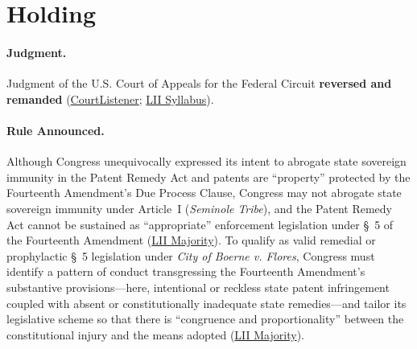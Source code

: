 \documentclass[12pt]{article}
\begin{document}
\section{Holding}

\paragraph{Judgment.}
Judgment of the U.S. Court of Appeals for the Federal Circuit \textbf{reversed and remanded} (\href{https://www.courtlistener.com/opinion/118316/florida-prepaid-postsecondary-education-expense-board-v-college-savings/}{CourtListener}; \href{https://www.law.cornell.edu/supct/html/98-531.ZS.html}{LII Syllabus}).

\paragraph{Rule Announced.}
Although Congress unequivocally expressed its intent to abrogate state sovereign immunity in the Patent Remedy Act and patents are ``property'' protected by the Fourteenth Amendment's Due Process Clause, Congress may not abrogate state sovereign immunity under Article~I (\textit{Seminole Tribe}), and the Patent Remedy Act cannot be sustained as ``appropriate'' enforcement legislation under \S~5 of the Fourteenth Amendment (\href{https://www.law.cornell.edu/supct/html/98-531.ZO.html}{LII Majority}). To qualify as valid remedial or prophylactic \S~5 legislation under \textit{City of Boerne v. Flores}, Congress must identify a pattern of conduct transgressing the Fourteenth Amendment's substantive provisions---here, intentional or reckless state patent infringement coupled with absent or constitutionally inadequate state remedies---and tailor its legislative scheme so that there is ``congruence and proportionality'' between the constitutional injury and the means adopted (\href{https://www.law.cornell.edu/supct/html/98-531.ZO.html}{LII Majority}).
\end{document}
